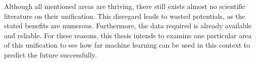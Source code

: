 Although all mentioned areas are thriving, there still exists almost no scientific literature on their unification. This disregard leads to wasted potentials, as the stated benefits are numerous. Furthermore, the data required is already available and reliable. For these reasons, this thesis intends to examine one particular area of this unification to see how far machine learning can be used in this context to predict the future successfully. 